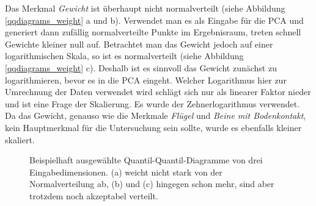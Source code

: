  Das Merkmal \emph{Gewicht} ist überhaupt nicht normalverteilt (siehe Abbildung \ref{qqdiagrams_weight} a und b). Verwendet man es als Eingabe für die PCA und generiert dann zufällig normalverteilte Punkte im Ergebnisraum, treten schnell Gewichte kleiner null auf.
 Betrachtet man das Gewicht jedoch auf einer logarithmischen Skala, so ist es normalverteilt (siehe Abbildung \ref{qqdiagrams_weight} c). Deshalb ist es sinnvoll das Gewicht zunächst zu logarithmieren, bevor es in die PCA eingeht.
 Welcher Logarithmus hier zur Umrechnung der Daten verwendet wird schlägt sich nur als linearer Faktor nieder und ist eine Frage der Skalierung. Es wurde der Zehnerlogarithmus verwendet. 
 Da das Gewicht, genauso wie die Merkmale \emph{Flügel} und \emph{Beine mit Bodenkontakt}, kein Hauptmerkmal für die Untersuchung sein sollte, wurde es ebenfalls kleiner skaliert.
 
 \begin{figure}
  \qquad
  \qquad
  
  \caption{Beispielhaft ausgewählte Quantil-Quantil-Diagramme von drei Eingabedimensionen. (a) weicht nicht stark von der Normalverteilung ab, (b) und (c) hingegen schon mehr, sind aber trotzdem noch akzeptabel verteilt.}
  \label{qqdiagram_examples}
 \end{figure}
 
